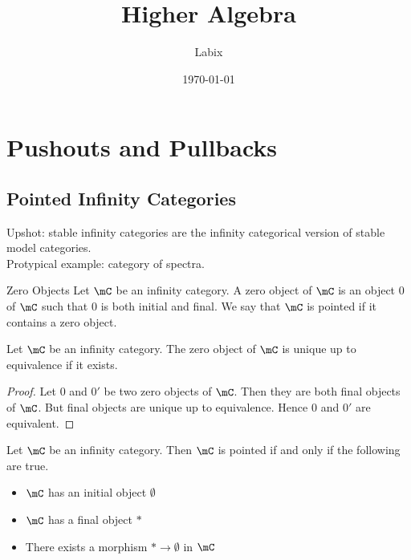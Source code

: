 \documentclass[a4paper]{article}
\title{Higher Algebra}
\author{Labix}
\date{\today}
\begin{document}
\maketitle
\begin{abstract}
\begin{itemize}
\end{itemize}
\end{abstract}
\pagebreak
\tableofcontents

\pagebreak
\section{Pushouts and Pullbacks}
\subsection{Pointed Infinity Categories}
Upshot: stable infinity categories are the infinity categorical version of stable model categories. \\
Protypical example: category of spectra. 

\begin{defn}{Zero Objects}{} Let $\mC$ be an infinity category. A zero object of $\mC$ is an object $0$ of $\mC$ such that $0$ is both initial and final. We say that $\mC$ is pointed if it contains a zero object. 
\end{defn}

\begin{lmm}{}{} Let $\mC$ be an infinity category. The zero object of $\mC$ is unique up to equivalence if it exists. 
\begin{proof}
Let $0$ and $0'$ be two zero objects of $\mC$. Then they are both final objects of $\mC$. But final objects are unique up to equivalence. Hence $0$ and $0'$ are equivalent. 
\end{proof}
\end{lmm}

\begin{lmm}{}{} Let $\mC$ be an infinity category. Then $\mC$ is pointed if and only if the following are true. 
\begin{itemize}
\item $\mC$ has an initial object $\emptyset$
\item $\mC$ has a final object $\ast$
\item There exists a morphism $\ast\to\emptyset$ in $\mC$
\end{itemize}
\end{lmm}
\end{document}
